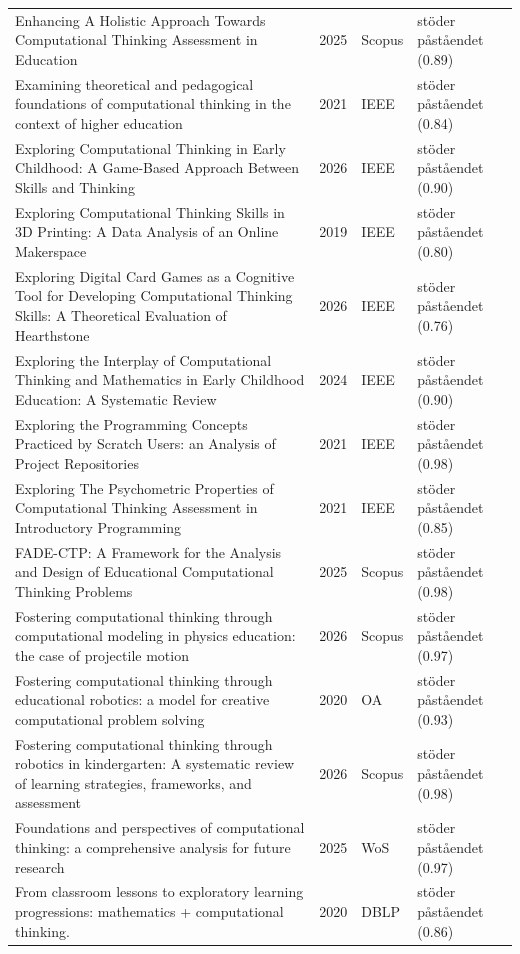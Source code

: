 \begin{longtable}{@{}%
  >{\raggedright\arraybackslash}p{}c%
  >{\raggedright\arraybackslash}p{}%
  >{\raggedright\arraybackslash}p{}@{}}
Enhancing A Holistic Approach Towards Computational Thinking Assessment in Education & 2025 & Scopus & stöder påståendet (0.89) \\
Examining theoretical and pedagogical foundations of computational thinking in the context of higher education & 2021 & IEEE & stöder påståendet (0.84) \\
Exploring Computational Thinking in Early Childhood: A Game-Based Approach Between Skills and Thinking & 2026 & IEEE & stöder påståendet (0.90) \\
Exploring Computational Thinking Skills in 3D Printing: A Data Analysis of an Online Makerspace & 2019 & IEEE & stöder påståendet (0.80) \\
Exploring Digital Card Games as a Cognitive Tool for Developing Computational Thinking Skills: A Theoretical Evaluation of Hearthstone & 2026 & IEEE & stöder påståendet (0.76) \\
Exploring the Interplay of Computational Thinking and Mathematics in Early Childhood Education: A Systematic Review & 2024 & IEEE & stöder påståendet (0.90) \\
Exploring the Programming Concepts Practiced by Scratch Users: an Analysis of Project Repositories & 2021 & IEEE & stöder påståendet (0.98) \\
Exploring The Psychometric Properties of Computational Thinking Assessment in Introductory Programming & 2021 & IEEE & stöder påståendet (0.85) \\
FADE-CTP: A Framework for the Analysis and Design of Educational Computational Thinking Problems & 2025 & Scopus & stöder påståendet (0.98) \\
Fostering computational thinking through computational modeling in physics education: the case of projectile motion & 2026 & Scopus & stöder påståendet (0.97) \\
Fostering computational thinking through educational robotics: a model for creative computational problem solving & 2020 & OA & stöder påståendet (0.93) \\
Fostering computational thinking through robotics in kindergarten: A systematic review of learning strategies, frameworks, and assessment & 2026 & Scopus & stöder påståendet (0.98) \\
Foundations and perspectives of computational thinking: a comprehensive analysis for future research & 2025 & WoS & stöder påståendet (0.97) \\
From classroom lessons to exploratory learning progressions: mathematics + computational thinking. & 2020 & DBLP & stöder påståendet (0.86) \\

\end{longtable}
